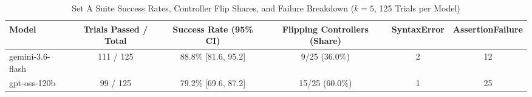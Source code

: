 \begin{table}[htbp]
\centering
\caption{Set A Suite Success Rates, Controller Flip Shares, and Failure Breakdown ($k=5$, 125 Trials per Model)}
\label{tab:seta_suite_success}
\begin{tabular}{lccccc}
\toprule
\textbf{Model} & \textbf{Trials Passed / Total} & \textbf{Success Rate (95\% CI)} & \textbf{Flipping Controllers (Share)} & \textbf{SyntaxError} & \textbf{AssertionFailure} \\
\midrule
gemini-3.6-flash & 111 / 125 & 88.8\% [81.6, 95.2] & 9/25 (36.0\%) & 2 & 12 \\
gpt-oss-120b & 99 / 125 & 79.2\% [69.6, 87.2] & 15/25 (60.0\%) & 1 & 25 \\
\bottomrule
\end{tabular}
\end{table}
